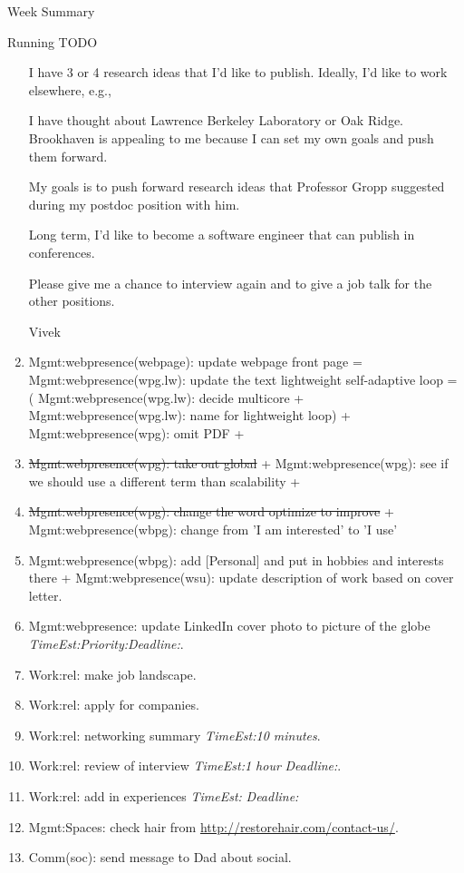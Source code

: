 \documentclass[serif, mathserif, final]{beamer}
\newcommand{\doneTask}[1]{\tiny \item \tiny \sout{#1}}
\newcommand{\te}[1]{\textit{TimeEst:}\textit{#1}}
\newcommand{\dl}[1]{\textit{Deadline:}\textit{#1}}
\newcommand{\pr}[1]{\textit{Priority:}\textit{#1}}
\begin{document}
\begin{frame}
\begin{columns}
\begin{column}{0.5\linewidth}
\begin{block}{Week Summary}
\begin{block}{Running TODO}
\begin{enumerate}
        I have 3 or 4 research ideas that I'd like to
        publish. Ideally, I'd like to work elsewhere, e.g., 

        I have thought about Lawrence Berkeley Laboratory or Oak
        Ridge. Brookhaven is appealing to me because I can set my own goals
        and push them forward. 

        My goals is to push forward research ideas that Professor
        Gropp suggested during my postdoc position with him. 
 
        Long term, I'd like to become a software 
        engineer that can publish in conferences.

        Please give me a chance to interview again and to give a job
        talk for the other positions.

        Vivek 

    \item \tiny Mgmt:webpresence(webpage): update webpage front page =
      Mgmt:webpresence(wpg.lw): update the text lightweight self-adaptive
      loop = ( Mgmt:webpresence(wpg.lw): decide multicore +
      Mgmt:webpresence(wpg.lw): name for lightweight loop) +
      Mgmt:webpresence(wpg): omit PDF  + \doneTask{Mgmt:webpresence(wpg): take
      out global} +  Mgmt:webpresence(wpg): see if we should use a different term
      than scalability  + \doneTask{Mgmt:webpresence(wpg): change the word
      optimize to improve}  + Mgmt:webpresence(wbpg): change from 'I am
      interested' to 'I use' 
    \item \tiny Mgmt:webpresence(wbpg): add [Personal] and put in hobbies and interests there  + 
      Mgmt:webpresence(wsu): update description of work based on cover
      letter. 
      \item \tiny Mgmt:webpresence: update LinkedIn cover photo to
        picture of the globe \te{}\pr{}\dl{}. 
      \item \tiny Work:rel: make job landscape.  
      \item \tiny Work:rel: apply for companies.
      \item \tiny Work:rel: networking summary \te{10 minutes}. 
      \item \tiny Work:rel: review of interview \te{1 hour} \dl{}. 
      \item \tiny Work:rel: add in experiences \te{} \dl{}
      \item \tiny Mgmt:Spaces: check hair from \url{http://restorehair.com/contact-us/}. 
      \item \tiny Comm(soc): send message to Dad about social. 


\end{enumerate}
\end{block}
\end{block}
\end{column}
\end{columns}
\end{frame}
\end{document}
